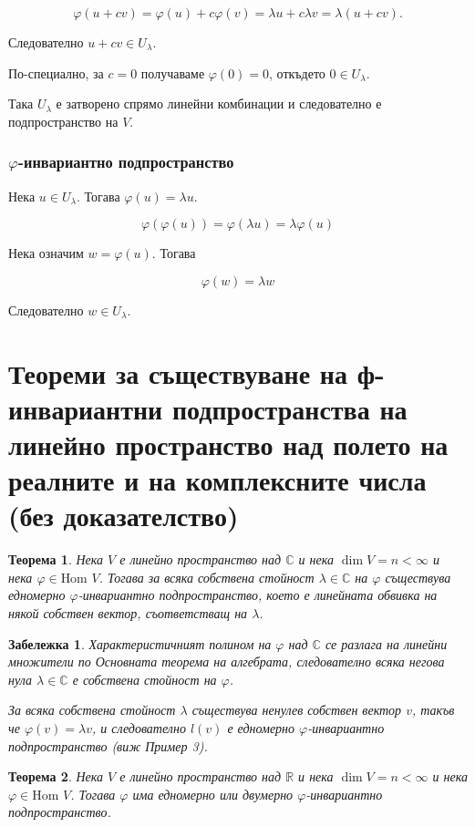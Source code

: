 \documentclass{scrartcl}
\newtheorem{theorem}{Теорема}
\newtheorem*{remark}{Забележка}
\begin{document}
\begin{FlushLeft}
\[
\varphi(u + cv)
= \varphi(u) + c\varphi(v)
= \lambda u + c\lambda v
= \lambda (u + cv).
\]

Следователно $u + cv \in U_\lambda$.

По-специално, за $c = 0$ получаваме $\varphi(0) = 0$, откъдето $0 \in U_\lambda$.

Така $U_\lambda$ е затворено спрямо линейни комбинации и следователно е подпространство на $V$.

\subsubsection*{$\varphi$-инвариантно подпространство}

Нека $u \in U_\lambda$. Тогава $\varphi(u) = \lambda u$.

$$\varphi(\varphi(u)) = \varphi(\lambda u) = \lambda\varphi(u)$$

Нека означим $w = \varphi(u)$. Тогава

$$\varphi(w) = \lambda w$$

Следователно $w \in U_\lambda$.

\section{Теореми за съществуване на ф-инвариантни
подпространства на линейно пространство над полето на реалните и на комплексните числа (без доказателство)}

\begin{theorem}
Нека $V$ е линейно пространство над $\mathbb{C}$ и нека $\dim{V} = n < \infty$ и нека $\varphi \in \text{Hom }{V}$. Тогава за всяка собствена стойност $\lambda \in \mathbb{C}$ на $\varphi$ съществува едномерно $\varphi$-инвариантно подпространство, което е линейната обвивка на някой собствен вектор, съответстващ на $\lambda$.
\end{theorem}

\begin{remark}
Характеристичният полином на $\varphi$ над $\mathbb{C}$ се разлага на линейни множители по Основната теорема на алгебрата, следователно всяка негова нула $\lambda \in \mathbb{C}$ е собствена стойност на $\varphi$.

За всяка собствена стойност $\lambda$ съществува ненулев собствен вектор $v$, такъв че $\varphi(v)=\lambda v$, и следователно $l(v)$ е едномерно $\varphi$-инвариантно подпространство (виж Пример 3).
\end{remark}

\begin{theorem}
Нека $V$ е линейно пространство над $\mathbb{R}$ и нека $\dim{V} = n < \infty$ и нека $\varphi \in \text{Hom }{V}$. Тогава $\varphi$ има едномерно или двумерно $\varphi$-инвариантно подпространство.
\end{theorem}


\end{FlushLeft}
\end{document}
